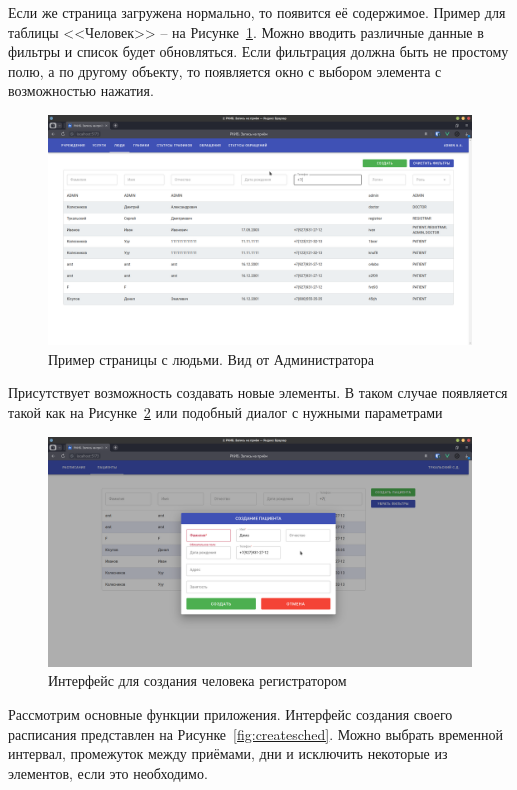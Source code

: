 \documentclass[a4paper,article]{article}
\begin{document}
\begin{sloppypar}
    Если же страница загружена нормально, то появится её содержимое. Пример для таблицы <<Человек>> -- на Рисунке~\ref{fig:uipeople}. Можно вводить различные данные в фильтры и список будет обновляться. Если фильтрация должна быть не простому полю, а по другому объекту, то появляется окно с выбором элемента с возможностью нажатия.
    
    \begin{figure}[h]
        \centering
        \includegraphics[width=0.8\linewidth]{UI. Люди от ADMIN.png}        
        \caption{\centering Пример страницы с людьми. Вид от Администратора}        
        \label{fig:uipeople}        
    \end{figure}
    
    \newpage
    
    Присутствует возможность создавать новые элементы. В таком случае появляется такой как на Рисунке~\ref{fig:uiadd} или подобный диалог с нужными параметрами
    
    \begin{figure}[h]
        \centering
        \includegraphics[width=0.8\linewidth]{UI. Создание человека.png}        
        \caption{\centering Интерфейс для создания человека регистратором}        
        \label{fig:uiadd}        
    \end{figure}
    
    Рассмотрим основные функции приложения. Интерфейс создания своего расписания представлен на Рисунке~\ref{fig:createsched}. Можно выбрать временной интервал, промежуток между приёмами, дни и исключить некоторые из элементов, если это необходимо.
    

\end{sloppypar}
\end{document}
